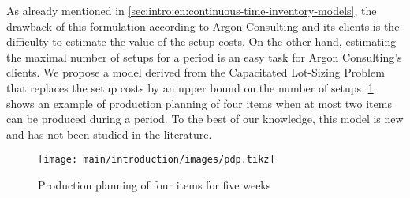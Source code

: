 As already mentioned in \cref{sec:intro:en:continuous-time-inventory-models}, the drawback of this formulation according to Argon Consulting and its clients is the difficulty to estimate the value of the setup costs.
On the other hand, estimating the maximal number of setups for a period is an easy task for Argon Consulting's clients.
We propose a model derived from the Capacitated Lot-Sizing Problem that replaces the setup costs by an upper bound on the number of setups.
\cref{fig:intro:en:pdp} shows an example of production planning of four items when at most two items can be produced during a period.
To the best of our knowledge, this model is new and has not been studied in the literature.


\begin{figure}[!ht]
  \centering
  \texttt{[image: main/introduction/images/pdp.tikz]}
  \caption{Production planning of four items for five weeks}
  \label{fig:intro:en:pdp}
\end{figure}



